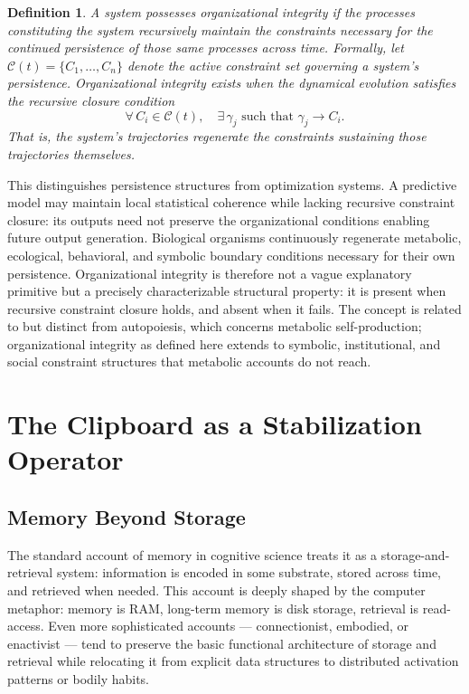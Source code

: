 \documentclass[12pt,a4paper]{report}
\theoremstyle{flyxion}
\newtheorem{definition}[theorem]{Definition}
\begin{document}
\begin{definition}
A system possesses \emph{organizational integrity} if the processes constituting the system recursively maintain the constraints necessary for the continued persistence of those same processes across time. Formally, let $\mathcal{C}(t) = \{C_1,\dots,C_n\}$ denote the active constraint set governing a system's persistence. Organizational integrity exists when the dynamical evolution satisfies the recursive closure condition
\[
\forall\, C_i \in \mathcal{C}(t), \quad \exists\, \gamma_j \text{ such that } \gamma_j \rightarrow C_i.
\]
That is, the system's trajectories regenerate the constraints sustaining those trajectories themselves.
\end{definition}

This distinguishes persistence structures from optimization systems. A predictive model may maintain local statistical coherence while lacking recursive constraint closure: its outputs need not preserve the organizational conditions enabling future output generation. Biological organisms continuously regenerate metabolic, ecological, behavioral, and symbolic boundary conditions necessary for their own persistence. Organizational integrity is therefore not a vague explanatory primitive but a precisely characterizable structural property: it is present when recursive constraint closure holds, and absent when it fails. The concept is related to but distinct from autopoiesis, which concerns metabolic self-production; organizational integrity as defined here extends to symbolic, institutional, and social constraint structures that metabolic accounts do not reach.

\chapter{The Clipboard as a Stabilization Operator}

\section{Memory Beyond Storage}

The standard account of memory in cognitive science treats it as a storage-and-retrieval system: information is encoded in some substrate, stored across time, and retrieved when needed. This account is deeply shaped by the computer metaphor: memory is RAM, long-term memory is disk storage, retrieval is read-access. Even more sophisticated accounts --- connectionist, embodied, or enactivist --- tend to preserve the basic functional architecture of storage and retrieval while relocating it from explicit data structures to distributed activation patterns or bodily habits.
\end{document}
